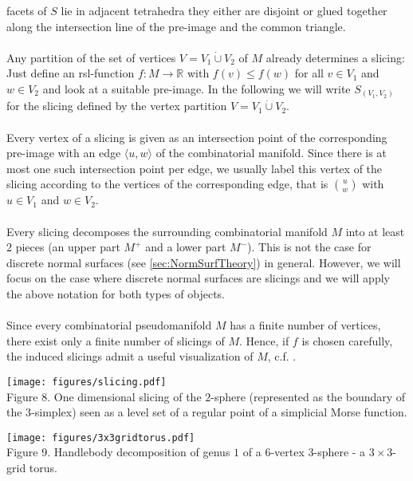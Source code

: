 \documentclass[a4paper,11pt]{report}
\begin{document}
{{facets of $S$ lie in adjacent tetrahedra they either are disjoint or glued together along
the intersection line of the pre-image and the common triangle.\\
\\
 Any partition of the set of vertices $V = V_1 \dot{\cup} V_2 $ of $M$ already determines a slicing: Just define an rsl-function $f: M \to \mathbb{R}$ with $f(v) \leq f(w)$ for all $v \in V_1$ and $w \in V_2$ and look at a suitable pre-image. In the following we will write $S_{(V_1,V_2)}$ for the slicing defined by the vertex partition $V = V_1 \dot{\cup} V_2 $.\\
\\
 Every vertex of a slicing is given as an intersection point of the
corresponding pre-image with an edge $\langle u,w \rangle$ of the combinatorial manifold. Since there is at most one such intersection
point per edge, we usually label this vertex of the slicing according to the
vertices of the corresponding edge, that is $\binom{u}{w}$ with $u \in V_1$ and $w \in V_2$.\\
\\
 Every slicing decomposes the surrounding combinatorial manifold $M$ into at least $2$ pieces (an upper part $M^+$ and a lower part $M^-$). This is not the case for discrete normal surfaces (see \ref{sec:NormSurfTheory}) in general. However, we will focus on the case where discrete normal
surfaces are slicings and we will apply the above notation for both types of
objects.\\
\\
 Since every combinatorial pseudomanifold $M$ has a finite number of vertices, there exist only a finite number of slicings
of $M$. Hence, if $f$ is chosen carefully, the induced slicings admit a useful visualization of $M$, c.f. \cite{Spreer09CombPorpsOfK3}.

 
	\medskip
	
	 

 
	\begin{center}
	\texttt{[image: figures/slicing.pdf]}\\\bigskip
	{\small Figure 8. One dimensional slicing of the $2$-sphere (represented as the boundary of the $3$-simplex) seen as a level set of a regular point of a simplicial Morse function.}
	\end{center}
	
	 

 
	\begin{center}
	\texttt{[image: figures/3x3gridtorus.pdf]}\\\bigskip
	{\small Figure 9. Handlebody decomposition of genus $1$ of a $6$-vertex $3$-sphere - a $3 \times 3$-grid torus.}
	\end{center}
	
}}
\end{document}
